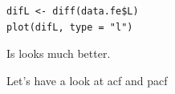 \documentclass[12pt,a4paper]{article}
\begin{document}
\begin{verbatim}
difL <- diff(data.fe$L)
plot(difL, type = "l")
\end{verbatim}
\begin{center}
\end{center}
Is looks much better.

Let's have a look at acf and pacf
\end{document}
